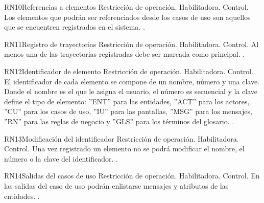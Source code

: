 	\begin{BussinesRule}{RN10}{Referencias a elementos} 
		\BRitem[Tipo:] Restricción de operación. 
		\BRitem[Clase:] Habilitadora. 
		\BRitem[Nivel:] Control. %
		\BRitem[Descripción:] Los elementos que podrán ser referenciados desde los casos de uso son aquellos que se encuentren registrados en el sistema.
		 \UCref{}{}. 
	\end{BussinesRule} 


	\begin{BussinesRule}{RN11}{Registro de trayectorias} 
		\BRitem[Tipo:] Restricción de operación. 
		\BRitem[Clase:] Habilitadora. 
		\BRitem[Nivel:] Control. %
		\BRitem[Descripción:] Al menos una de las trayectorias registradas debe ser marcada como principal.
		 \UCref{}{}. 
	\end{BussinesRule}

\begin{BussinesRule}{RN12}{Identificador de elemento} 
	\BRitem[Tipo:] Restricción de operación. 
	\BRitem[Clase:] Habilitadora. 
	\BRitem[Nivel:] Control. %
	\BRitem[Descripción:] El identificador de cada elemento se compone de un nombre, número y una clave. Donde el nombre es el que le asigna el usuario, el número es secuencial y la clave define el tipo de elemento: ''ENT'' para las entidades, ''ACT'' para los actores, ''CU'' para los casos de uso, ''IU'' para las pantallas, ''MSG'' para los mensajes, ''RN'' para las reglas de negocio y ''GLS'' para los términos del glosario.
	 \UCref{}{}. 
\end{BussinesRule}

\begin{BussinesRule}{RN13}{Modificación del identificador} 
	\BRitem[Tipo:] Restricción de operación. 
	\BRitem[Clase:] Habilitadora. 
	\BRitem[Nivel:] Control. %
	\BRitem[Descripción:] Una vez registrado un elemento no se podrá modificar el nombre, el número o la clave del identificador.
	 \UCref{}{}. 
\end{BussinesRule}

\begin{BussinesRule}{RN14}{Salidas del casos de uso} 
	\BRitem[Tipo:] Restricción de operación. 
	\BRitem[Clase:] Habilitadora. 
	\BRitem[Nivel:] Control. %
	\BRitem[Descripción:] En las salidas del caso de uso podrán enlistarse mensajes y atributos de las entidades.
	 \UCref{}{}. 
\end{BussinesRule}

